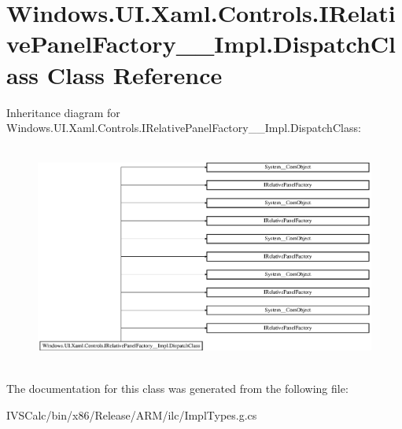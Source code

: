 \hypertarget{class_windows_1_1_u_i_1_1_xaml_1_1_controls_1_1_i_relative_panel_factory_____impl_1_1_dispatch_class}{}\section{Windows.\+U\+I.\+Xaml.\+Controls.\+I\+Relative\+Panel\+Factory\+\_\+\+\_\+\+Impl.\+Dispatch\+Class Class Reference}
\label{class_windows_1_1_u_i_1_1_xaml_1_1_controls_1_1_i_relative_panel_factory_____impl_1_1_dispatch_class}
Inheritance diagram for Windows.\+U\+I.\+Xaml.\+Controls.\+I\+Relative\+Panel\+Factory\+\_\+\+\_\+\+Impl.\+Dispatch\+Class\+:\begin{figure}[H]
\begin{center}
\leavevmode
\includegraphics[height=7.403846cm]{class_windows_1_1_u_i_1_1_xaml_1_1_controls_1_1_i_relative_panel_factory_____impl_1_1_dispatch_class}
\end{center}
\end{figure}


The documentation for this class was generated from the following file\+:\begin{DoxyCompactItemize}
\item 
I\+V\+S\+Calc/bin/x86/\+Release/\+A\+R\+M/ilc/Impl\+Types.\+g.\+cs\end{DoxyCompactItemize}
